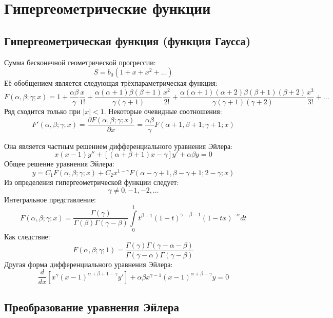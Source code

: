 \section{Гипергеометрические функции}

\subsection{Гипергеометрическая функция (функция Гаусса)}

Сумма бесконечной геометрической прогрессии:
\[
	S = b_0(1 + x + x^2 + \ldots)
\]
Её обобщением является следующая трёхпараметрическая функция:
\[
	F(\alpha, \beta; \gamma; x) = 
	1+
	\frac{\alpha \beta}{\gamma} \frac{x}{1!} + 
	\frac{\alpha(\alpha + 1) \beta (\beta + 1)}{\gamma (\gamma + 1)} \frac{x^2}{2!} +
	\frac{\alpha(\alpha + 1)(\alpha + 2) \beta (\beta + 1)(\beta + 2)}{\gamma (\gamma + 1)(\gamma + 2)} \frac{x^3}{3!} +
	\ldots
\]
Ряд сходится только при $|x| < 1$.
Некоторые очевидные соотношения:
\[
	F'(\alpha, \beta; \gamma; x) = 
	\frac{\partial F(\alpha, \beta; \gamma; x)}{\partial x} = 
	\frac{\alpha \beta}{\gamma} F(\alpha+1, \beta + 1; \gamma + 1; x)
\]

Она является частным решением дифференциального уравнения Эйлера:
\[
	x(x - 1) y'' + [(\alpha + \beta + 1)x - \gamma] y' + \alpha \beta y = 0
\]
Общее решение уравнения Эйлера:
\[
	y = C_1 F(\alpha, \beta; \gamma; x) + C_2 x^{1 - \gamma} F(\alpha - \gamma + 1, \beta - \gamma + 1; 2 - \gamma; x)
\]
Из определения гипергеометрической функции следует:
\[
	\gamma \ne 0, -1, -2, \ldots
\]
Интегральное представление:
\[
	F(\alpha, \beta; \gamma; x) =
	\frac{\Gamma(\gamma)}{\Gamma(\beta) \Gamma(\gamma - \beta)}
	\int\limits_0^1 t^{\beta-1}(1 - t)^{\gamma - \beta - 1} (1 - tx)^{-\alpha} dt
\]
Как следствие:
\[
	F(\alpha, \beta; \gamma; 1) = \frac{\Gamma(\gamma)\Gamma(\gamma - \alpha - \beta)}{\Gamma(\gamma - \alpha)\Gamma(\gamma - \beta)}
\]
Другая форма дифференциального уравнения Эйлера:
\[
	\frac{d}{dx}
	\left[x^\gamma(x - 1)^{\alpha + \beta + 1 - \gamma} y'\right] + \alpha \beta x^{\gamma - 1}(x - 1)^{\alpha + \beta - \gamma} y = 0
\]

\subsection{Преобразование уравнения Эйлера}

